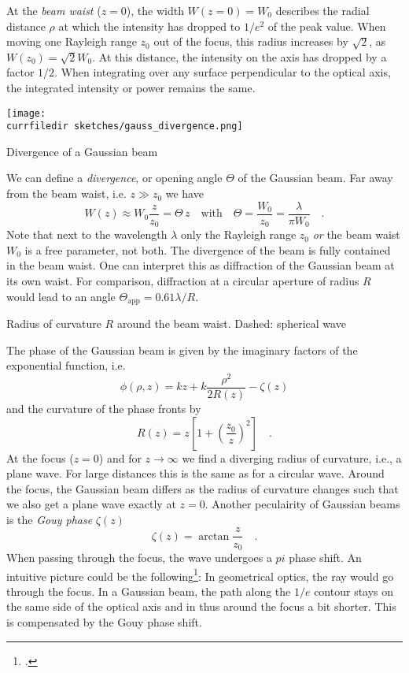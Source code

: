 At the \emph{beam waist} ($z=0$), the width $W(z=0) = W_0$ describes the radial distance $\rho$ at which the intensity  has dropped to $1/e^2$ of the peak value. When moving one Rayleigh range $z_0$ out of the focus, this radius increases by $\sqrt{2}$, as $W(z_0) = \sqrt{2} W_0$. At this distance, the intensity on the axis has dropped by a factor $1/2$. When integrating over any surface perpendicular to the optical axis, the integrated intensity or power remains the same.

\begin{marginfigure}
    \texttt{[image: \\currfiledir sketches/gauss\_divergence.png]}
   \caption{Divergence of a Gaussian beam}
\end{marginfigure}


We can define a \emph{divergence}, or opening angle $\Theta$ of the Gaussian beam. Far away from the beam waist, i.e. $z \gg z_0$ we have
\begin{equation}
    W(z) \approx W_0 \frac{z}{z_0} = \Theta \, z \quad \text{with} \quad \Theta = \frac{W_0}{z_0} = \frac{\lambda}{\pi W_0} \quad .
 \end{equation}
 Note that next to the wavelength $\lambda$ only the Rayleigh range $z_0$ \emph{or} the beam waist $W_0$ is a free parameter, not both. The divergence of the beam is fully contained in the beam waist. One can interpret this as diffraction of the Gaussian beam at its own waist. For comparison, diffraction at a circular aperture of radius $R$ would  lead to an angle $\Theta_\text{app} = 0.61 \lambda  / R$.


\begin{marginfigure}
   \caption{Radius of curvature $R$ around the beam waist. Dashed: spherical wave}
\end{marginfigure}


The phase of the Gaussian beam is given by the imaginary factors of the exponential function, i.e.
\begin{equation}
    \phi(\rho, z) = k z + k  \frac{\rho^2}{2 R(z)}  -  \zeta(z) 
\end{equation}
and the curvature of the phase fronts by 
\begin{equation}
    R(z) = z \left[ 1 + \left( \frac{z_0}{z} \right)^2 \right]  \quad .
\end{equation}
At the focus ($z=0$) and for $z \rightarrow \infty$ we find a diverging radius of curvature, i.e., a plane wave. For large distances this is the same as for a circular wave. Around the focus, the Gaussian beam differs as the radius of curvature changes such that we also get a plane wave exactly at $z=0$. Another peculairity of Gaussian beams is the \emph{Gouy phase} $\zeta(z)$
\begin{equation}
    \zeta(z) =  \arctan \frac{z}{z_0}  \quad .
\end{equation}
When passing through the focus, the wave undergoes a $pi$ phase shift. An intuitive picture could be the following\footcite{Boyd1980IntuitiveEO}: In geometrical optics, the ray would go through the focus. In a Gaussian beam, the path along the $1/e$ contour stays on the same side of the optical axis and in thus around the focus a bit shorter. This is compensated by the Gouy phase shift.

